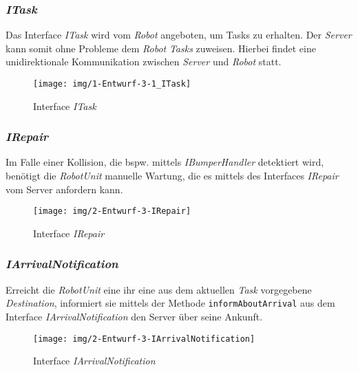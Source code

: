 	\subsubsection{\textit{ITask}}
	Das Interface \textit{ITask} wird vom \textit{Robot} angeboten, um Tasks zu erhalten. 
	Der \emph{Server} kann somit ohne Probleme dem \textit{Robot} \textit{Tasks} zuweisen. 
	Hierbei findet eine unidirektionale Kommunikation zwischen \emph{Server} und \emph{Robot} statt.
	\begin{figure}[H]
	\centering
	\texttt{[image: img/1-Entwurf-3-1\_ITask]}
	\caption{Interface \emph{ITask}}
	\label{ITask}
	\end{figure}
	
	\subsubsection{\textit{IRepair}}
	Im Falle einer Kollision, die bspw. mittels \textit{IBumperHandler} detektiert wird, benötigt die \textit{RobotUnit} manuelle Wartung, die es mittels des Interfaces \textit{IRepair} vom Server anfordern kann.
	\begin{figure}[H]
	\centering
	\texttt{[image: img/2-Entwurf-3-IRepair]}
	\caption{Interface \emph{IRepair}}
	\label{IRepair}
	\end{figure}
		
	\subsubsection{\textit{IArrivalNotification}}
	Erreicht die \textit{RobotUnit} eine ihr eine aus dem aktuellen \textit{Task} vorgegebene \textit{Destination}, informiert sie mittels der Methode \texttt{informAboutArrival} aus dem Interface \textit{IArrivalNotification} den Server über seine Ankunft.
	\begin{figure}[H]
	\centering
	\texttt{[image: img/2-Entwurf-3-IArrivalNotification]}
	\caption{Interface \emph{IArrivalNotification}}
	\label{IArrivaleNotification}
	\end{figure}
